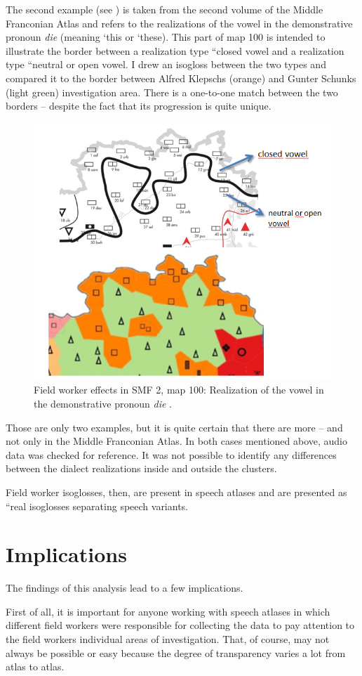 \documentclass[output=paper]{LSP/langsci}
\begin{document}
The second example (see ) is taken from the second volume of the Middle Franconian Atlas and refers to the realizations of the vowel in the demonstrative pronoun \textit{die} (meaning `this{\textquotesingle} or `these{\textquotesingle}). This part of map 100 is intended to illustrate the border between a realization type ``closed vowel{\textquotedbl} and a realization type ``neutral or open vowel{\textquotedbl}. I drew an isogloss between the two types and compared it to the border between Alfred Klepsch{\textquotesingle}s (orange) and Gunter Schunk{\textquotesingle}s (light green) investigation area. There is a one-to-one match between the two borders – despite the fact that its progression is quite unique.

\begin{figure}
\includegraphics[width=.4\textwidth]{illustrations/mathus_fig12}
\caption{Field worker effects in SMF 2, map 100: Realization of the vowel in the demonstrative pronoun \textit{die} \citep[241]{mathussek_sprachraume_2014}.}
\label{fig:12}
\end{figure}

Those are only two examples, but it is quite certain that there are more – and not only in the Middle Franconian Atlas. In both cases mentioned above, audio data was checked for reference. It was not possible to identify any differences between the dialect realizations inside and outside the clusters.

Field worker isoglosses, then, are present in speech atlases and are presented as ``real isoglosses{\textquotedbl} separating speech variants.

\section{Implications}
The findings of this analysis lead to a few implications.

First of all, it is important for anyone working with speech atlases in which different field workers were responsible for collecting the data to pay attention to the field workers{\textquotesingle} individual areas of investigation. That, of course, may not always be possible or easy because the degree of transparency varies a lot from atlas to atlas.
\end{document}
